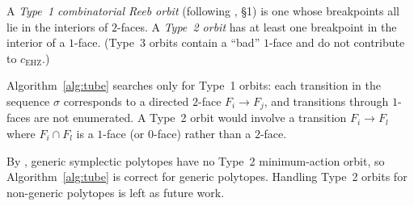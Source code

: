 \begin{remark}\label{rem:type-2}
A \emph{Type~1 combinatorial Reeb orbit} (following \cite{CH2021}, \S 1)
is one whose breakpoints all lie in the interiors of $2$-faces.
A \emph{Type~2 orbit} has at least one breakpoint in the interior of a $1$-face.
(Type~3 orbits contain a ``bad'' $1$-face and do not contribute to $c_{\mathrm{EHZ}}$.)

Algorithm~\ref{alg:tube} searches only for Type~1 orbits:
each transition in the sequence $\sigma$ corresponds to a directed $2$-face $F_i \to F_j$,
and transitions through $1$-faces are not enumerated.
A Type~2 orbit would involve a transition $F_i \to F_l$ where
$F_i \cap F_l$ is a $1$-face (or $0$-face)
rather than a $2$-face.

By \cite[Conj.~1.26]{CH2021},
generic symplectic polytopes have no Type~2 minimum-action orbit,
so Algorithm~\ref{alg:tube} is correct for generic polytopes.
Handling Type~2 orbits for non-generic polytopes is left as future work.
\end{remark}
